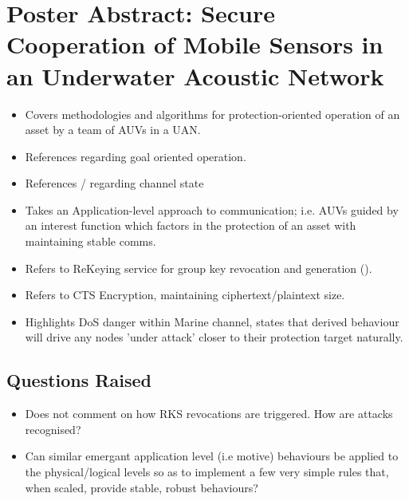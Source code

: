 \section{Poster Abstract: Secure Cooperation of Mobile Sensors in an Underwater 
Acoustic Network \citet*{Caiti}}
\label{Caiti}
\begin{itemize}
  \item Covers methodologies and algorithms for protection-oriented operation of an asset by a team of AUVs in a UAN.
  \item References \cite{Curtin1993} regarding goal oriented operation.
  \item References \cite{Akyildiz2005}/\cite{Caitia} regarding channel state
  \item Takes an Application-level approach to communication; i.e. AUVs guided by an interest function which factors in the protection of an asset with maintaining stable comms.
  \item Refers to ReKeying service for group key revocation and generation (\cite{Dini}).
  \item Refers to CTS Encryption, maintaining ciphertext/plaintext size.
  \item Highlights DoS danger within Marine channel, states that derived behaviour will drive any nodes 'under attack' closer to their protection target naturally.
\end{itemize}

\subsection{Questions Raised}
\begin{itemize}
  \item Does not comment on how RKS revocations are triggered. How are attacks recognised?
  \item Can similar emergant application level (i.e motive) behaviours be applied to the physical/logical levels so as to implement a few very simple rules that, when scaled, provide stable, robust behaviours?
\end{itemize}
